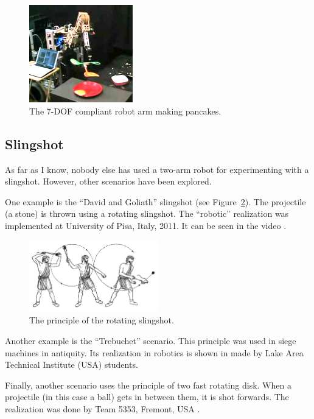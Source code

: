         \begin{figure}[h]
        \includegraphics[width=0.4\textwidth]{RobotPancakes.png}
        \centering
        \caption{The 7-DOF compliant robot arm making pancakes.}
        \label{fig:RobotPancakes}
        \end{figure}

    \subsection{Slingshot}
        As far as I know, nobody else has used a two-arm robot for experimenting with a slingshot.
        However, other scenarios have been explored.

        One example is the ``David and Goliath'' slingshot (see Figure~\ref{fig:DavidsSlingshot}). The projectile (a stone) is thrown using a rotating slingshot. The ``robotic'' realization was implemented at University of Pisa, Italy, 2011. It can be seen in the video \cite{DavidLikeSlingshot}.

        \begin{figure}[h]
        \includegraphics[width=0.5\textwidth]{DavidsSlingshot.png}
        \centering
        \caption{The principle of the rotating slingshot.}
        \label{fig:DavidsSlingshot}
        \end{figure}


        Another example is the ``Trebuchet'' scenario. This principle was used in siege machines in antiquity. Its realization in robotics is shown in \cite{Trebuchet} made by Lake Area Technical Institute (USA) students.

        Finally, another scenario uses the principle of two fast rotating disk. When a projectile (in this case a ball) gets in between them, it is shot forwards. The realization was done by Team 5353, Fremont, USA \cite{TwoRotatingDisks}.


